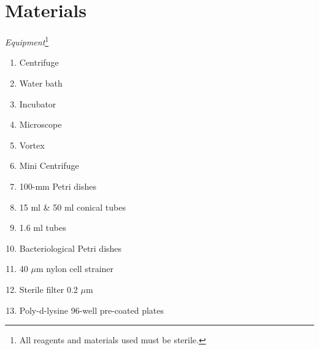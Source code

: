 \section{Materials}

\textit{Equipment}\footnote{All reagents and materials used must be sterile.}

{
  \begin{enumerate}
  \item Centrifuge
  \item Water bath
  \item Incubator
  \item Microscope
  \item Vortex
  \item Mini Centrifuge
  \item 100-mm Petri dishes
  \item 15 ml \& 50 ml conical tubes
  \item 1.6 ml tubes
  \item Bacteriological Petri dishes
  \item 40 \( \mu \)m nylon cell strainer
  \item Sterile filter 0.2 \( \mu \)m
  \item Poly-d-lysine 96-well pre-coated plates
  \end{enumerate}
}

\pagebreak

